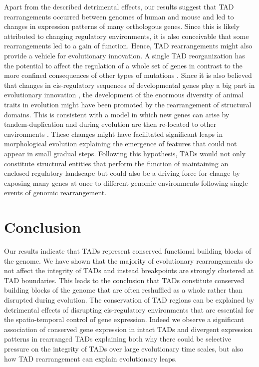 \documentclass[a4paper,twoside=true,openright,parskip=full,chapterprefix=true,11pt,headings=normal,bibliography=totoc,listof=totoc,titlepage=on,captions=tableabove,draft=false]{scrreprt}
\theoremstyle{definition}
\theoremstyle{definition}
\theoremstyle{definition}
\theoremstyle{remark}
\begin{document}
Apart from the described detrimental effects, our results suggest that
TAD rearrangements occurred between genomes of human and mouse and led
to changes in expression patterns of many orthologous genes. Since this
is likely attributed to changing regulatory environments, it is also
conceivable that some rearrangements led to a gain of function. Hence,
TAD rearrangements might also provide a vehicle for evolutionary
innovation. A single TAD reorganization has the potential to affect the
regulation of a whole set of genes in contrast to the more confined
consequences of other types of mutations \citep{Acemel2017}. Since it is
also believed that changes in cis-regulatory sequences of developmental
genes play a big part in evolutionary innovation \citep{Carroll2008},
the development of the enormous diversity of animal traits in evolution
might have been promoted by the rearrangement of structural domains.
This is consistent with a model in which new genes can arise by
tandem-duplication and during evolution are then re-located to other
environments \citep{Ibn-Salem2017}. These changes might have facilitated
significant leaps in morphological evolution explaining the emergence of
features that could not appear in small gradual steps. Following this
hypothesis, TADs would not only constitute structural entities that
perform the function of maintaining an enclosed regulatory landscape but
could also be a driving force for change by exposing many genes at once
to different genomic environments following single events of genomic
rearrangement.

\hypertarget{conclusion-1}{%
\section{Conclusion}\label{conclusion-1}}

Our results indicate that TADs represent conserved functional building
blocks of the genome. We have shown that the majority of evolutionary
rearrangements do not affect the integrity of TADs and instead
breakpoints are strongly clustered at TAD boundaries. This leads to the
conclusion that TADs constitute conserved building blocks of the genome
that are often reshuffled as a whole rather than disrupted during
evolution. The conservation of TAD regions can be explained by
detrimental effects of disrupting cis-regulatory environments that are
essential for the spatio-temporal control of gene expression. Indeed we
observe a significant association of conserved gene expression in intact
TADs and divergent expression patterns in rearranged TADs explaining
both why there could be selective pressure on the integrity of TADs over
large evolutionary time scales, but also how TAD rearrangement can
explain evolutionary leaps.
\end{document}
